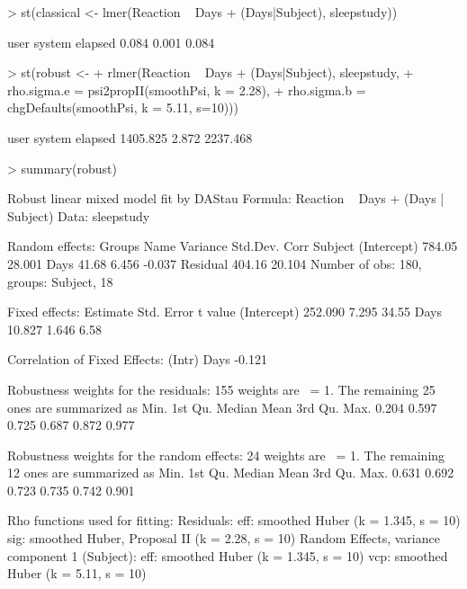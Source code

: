 \documentclass[11pt, a4paper]{article}
\renewenvironment{Schunk}{\vspace{\topsep}}{\vspace{\topsep}}
\theoremstyle{note}
\begin{document}
\begin{Schunk}
\begin{Sinput}
> st(classical <- lmer(Reaction ~ Days + (Days|Subject), sleepstudy))
\end{Sinput}
\end{Schunk}
\begin{Schunk}
\begin{Soutput}
   user  system elapsed 
  0.084   0.001   0.084 
\end{Soutput}
\end{Schunk}
\begin{Schunk}
\begin{Sinput}
> st(robust <-
+    rlmer(Reaction ~ Days + (Days|Subject), sleepstudy,
+          rho.sigma.e = psi2propII(smoothPsi, k = 2.28),
+          rho.sigma.b = chgDefaults(smoothPsi, k = 5.11, s=10)))
\end{Sinput}
\begin{Soutput}
    user   system  elapsed 
1405.825    2.872 2237.468 
\end{Soutput}
\begin{Sinput}
> summary(robust)
\end{Sinput}
\begin{Soutput}
Robust linear mixed model fit by DAStau 
Formula: Reaction ~ Days + (Days | Subject) 
   Data: sleepstudy 

Random effects:
 Groups   Name        Variance Std.Dev. Corr  
 Subject  (Intercept) 784.05   28.001         
          Days         41.68    6.456   -0.037
 Residual             404.16   20.104         
Number of obs: 180, groups: Subject, 18

Fixed effects:
            Estimate Std. Error t value
(Intercept)  252.090      7.295   34.55
Days          10.827      1.646    6.58

Correlation of Fixed Effects:
     (Intr)
Days -0.121

Robustness weights for the residuals: 
 155 weights are ~= 1. The remaining 25 ones are summarized as
   Min. 1st Qu.  Median    Mean 3rd Qu.    Max. 
  0.204   0.597   0.725   0.687   0.872   0.977 

Robustness weights for the random effects: 
 24 weights are ~= 1. The remaining 12 ones are summarized as
   Min. 1st Qu.  Median    Mean 3rd Qu.    Max. 
  0.631   0.692   0.723   0.735   0.742   0.901 

Rho functions used for fitting:
  Residuals:
    eff: smoothed Huber (k = 1.345, s = 10) 
    sig: smoothed Huber, Proposal II (k = 2.28, s = 10) 
  Random Effects, variance component 1 (Subject):
    eff: smoothed Huber (k = 1.345, s = 10) 
    vcp: smoothed Huber (k = 5.11, s = 10) 
\end{Soutput}
\end{Schunk}
\end{document}
